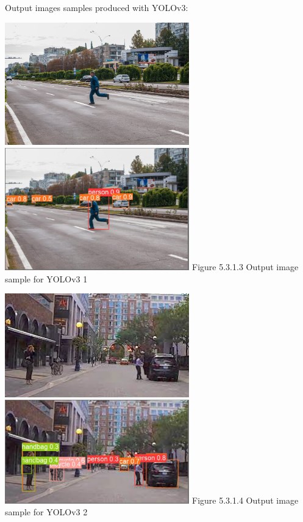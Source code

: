 \documentclass[runningheads,a4paper,11pt]{report}
\begin{document}
Output images samples produced with YOLOv3:
\begin{center}
\includegraphics[width=8cm]{images/image1.png}   
\includegraphics[width=8cm]{images/image1_label.PNG}
Figure 5.3.1.3 Output image sample for YOLOv3 1
\end{center}
\begin{center}
\includegraphics[width=8cm]{images/image2.jpg}   
\includegraphics[width=8cm]{images/image2_label.PNG}
Figure 5.3.1.4 Output image sample for YOLOv3 2
\end{center}
\end{document}
